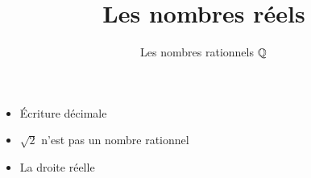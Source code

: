 







\title{{\bf Les nombres réels}}
\subtitle{Les nombres rationnels $\mathbb{Q}$}

\begin{frame}
  
  \debutmontitre

  \pause

{\footnotesize
\hfill
{}
\begin{minipage}{0.6\textwidth}
  \begin{itemize}
   \item<3-> \'Ecriture décimale
   \item<4-> $\sqrt2$ n'est pas un nombre rationnel
   \item<5-> La droite réelle
  \end{itemize}
\end{minipage}
}

\end{frame}

\setcounter{framenumber}{0}


